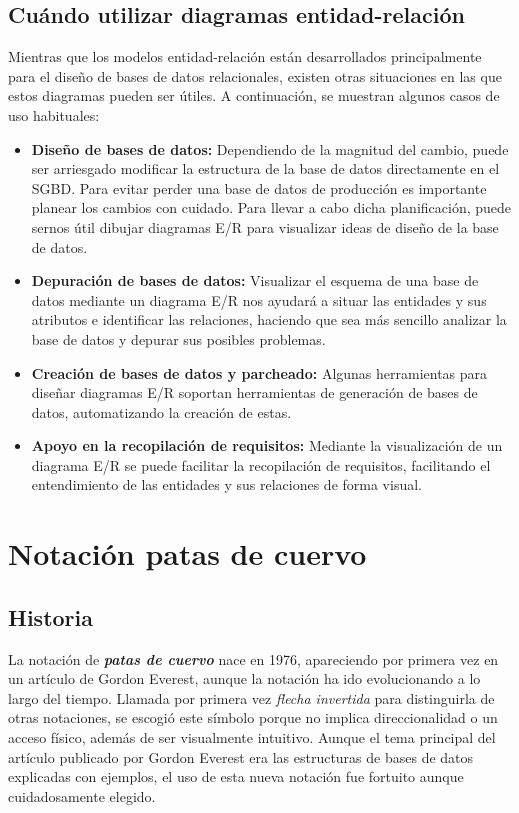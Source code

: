 \subsection{Cuándo utilizar diagramas entidad-relación}
Mientras que los modelos entidad-relación están desarrollados principalmente para el diseño de bases de datos relacionales, existen otras situaciones en las que estos diagramas pueden ser útiles. A continuación, se muestran algunos casos de uso habituales\cite{vp:erd}:
\begin{itemize}
    \item \textbf{Diseño de bases de datos: } Dependiendo de la magnitud del cambio, puede ser arriesgado modificar la estructura de la base de datos directamente en el SGBD. Para evitar perder una base de datos de producción es importante planear los cambios con cuidado. Para llevar a cabo dicha planificación, puede sernos útil dibujar diagramas E/R para visualizar ideas de diseño de la base de datos.
    \item \textbf{Depuración de bases de datos: } Visualizar el esquema de una base de datos mediante un diagrama E/R nos ayudará a situar las entidades y sus atributos e identificar las relaciones, haciendo que sea más sencillo analizar la base de datos y depurar sus posibles problemas.
    \item \textbf{Creación de bases de datos y parcheado: }Algunas herramientas para diseñar diagramas E/R soportan herramientas de generación de bases de datos, automatizando la creación de estas.
    \item \textbf{Apoyo en la recopilación de requisitos: }Mediante la visualización de un diagrama E/R se puede facilitar la recopilación de requisitos, facilitando el entendimiento de las entidades y sus relaciones de forma visual.
\end{itemize}

\section{Notación patas de cuervo}
\subsection{Historia}
La notación de \textbf{\textit{patas de cuervo}} nace en 1976, apareciendo por primera vez en un artículo de Gordon Everest\cite{ge-bdsm}, aunque la notación ha ido evolucionando a lo largo del tiempo. Llamada por primera vez \emph{flecha invertida} para distinguirla de otras notaciones, se escogió este símbolo porque no implica direccionalidad o un acceso físico, además de ser visualmente intuitivo\cite{vert:crowsfoot}. Aunque el tema principal del artículo publicado por Gordon Everest era las estructuras de bases de datos explicadas con ejemplos, el uso de esta nueva notación fue fortuito aunque cuidadosamente elegido.

